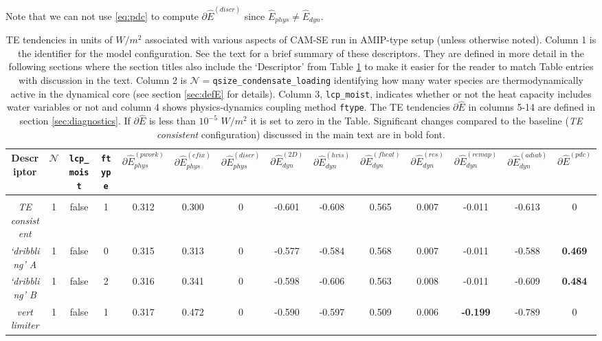 \documentclass[draft,linenumbers]{agujournal}
\newcommand*{\gi}[1]{\widehat{#1}}
\begin{document}
Note that we can not use \eqref{eq:pdc} to compute $\partial \gi{E}^{({discr})}$ since $\gi{E}_{phys}\neq \gi{E}_{dyn}$.
%
\begin{table}
  \caption{TE tendencies in units of $W/m^2$ associated with various aspects of CAM-SE run in AMIP-type setup (unless otherwise noted). Column 1 is the identifier for the model configuration. See the text for a brief summary of these descriptors. They are defined in more detail in the following sections where the section titles also include the `Descriptor' from Table \ref{table:TE} to make it easier for the reader to match Table entries with discussion in the text. Column 2 is $\mathcal{N}=${\tt{qsize\_condensate\_loading}} identifying how many water species are thermodynamically{\color{red}{/inertially}} active in the dynamical core (see section \ref{sec:defE} for details). Column 3, {\tt{lcp\_moist}}, indicates whether or not the heat capacity includes water variables or not and column 4 shows physics-dynamics coupling method {\tt{ftype}}. The TE tendencies $\partial \gi{E}$ in columns 5-14 are defined in section \ref{sec:diagnostics}. If $\partial \gi{E}$ is less than $10^{-5}$ $W/m^2$ it is set to zero in the Table. Significant changes compared to the baseline ({\em{TE consistent}} configuration) discussed in the main text are in bold font.}
\label{table:TE}
\begin{tabular}{c|ccc|ccc|cccccc|c}
Descriptor & $\mathcal{N}$ & {\tt{lcp\_moist}} &  {\tt{ftype}}  & $\partial \gi{E}_{phys}^{({pwork})}$ &  $\partial \gi{E}_{phys}^{({efix})}$ &  $\partial \gi{E}_{phys}^{({discr})}$ &  $\partial \gi{E}_{dyn}^{({2D})}$ & $\partial \gi{E}_{dyn}^{({hvis})}$ & $\partial \gi{E}_{dyn}^{({fheat})}$ & $\partial \gi{E}_{dyn}^{(res)}$ & $\partial \gi{E}_{dyn}^{(remap)}$ & $\partial \gi{E}_{dyn}^{(adiab)}$  & $\partial \gi{E}^{(pdc)}$\\
\hline \hline \\
{\em{TE consistent}}& 1 & false & 1 &  0.312&  0.300& 0    & -0.601& -0.608&  0.565& 0.007          & -0.011& -0.613 &  0\\
{\em{`dribbling' A}}& 1 & false & 0 &  0.315&  0.313& 0    & -0.577& -0.584&  0.568& 0.007          & -0.011& -0.588 &  {\bf{0.469}}\\
{\em{`dribbling' B}}& 1 & false & 2 &  0.316&  0.341& 0    & -0.598& -0.606&  0.563& 0.008          & -0.011& -0.609 &  {\bf{0.484}}\\
{\em{vert limiter}} & 1 & false & 1 &  0.317&  0.472& 0    & -0.590& -0.597&  0.509& 0.006          & {\bf{-0.199}} & -0.789 &  0\\

\end{tabular}
\end{table}
\end{document}
